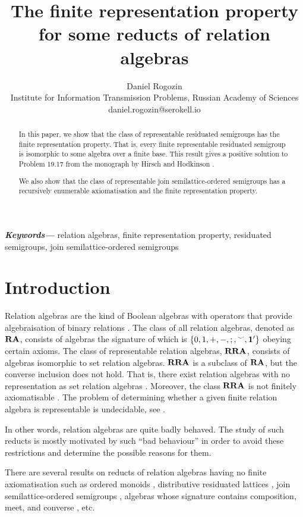 \documentclass[a4paper]{article}
\author{Daniel Rogozin \\ Institute for Information Transmission Problems, Russian Academy of Sciences \\ daniel.rogozin@serokell.io}
\date{}
\title{The finite representation property for some reducts of relation algebras}
\theoremstyle{definition}
\theoremstyle{theorem}
\theoremstyle{proposition}
\theoremstyle{lemma}
\theoremstyle{ex}
\theoremstyle{corollary}
\theoremstyle{claim}
\providecommand{\keywords}[1]{\textbf{\textit{Keywords---}} #1}
\begin{document}
\maketitle

\begin{abstract}
In this paper, we show that the class of representable residuated semigroups has the finite representation property. That is, every finite representable residuated semigroup is isomorphic to some algebra over a finite base. This result gives a positive solution to Problem 19.17 from the monograph by Hirsch and Hodkinson \cite{hirsch2002relation}.

We also show that the class of representable join semilattice-ordered semigroups has a recursively
enumerable axiomatisation and the finite representation property.
\end{abstract}

\keywords{relation algebras, finite representation property, residuated semigroups, join semilattice-ordered semigroups}

\section{Introduction}

Relation algebras are the kind of Boolean algebras with operators that provide algebraisation
of binary relations \cite{jonsson1951boolean}. The class of all relation algebras,
denoted as ${\bf RA}$, consists of algebras the signature of which is $\{ 0, 1, +, -, ;, {}^{\smile}, {\bf 1}' \}$ obeying certain axioms.
The class of representable relation algebras, ${\bf RRA}$, consists of algebras isomorphic to set relation algebras. ${\bf RRA}$ is a subclass of ${\bf RA}$, but the converse inclusion does not hold.
That is, there exist relation algebras with no representation as set relation algebras
\cite{lyndon1950representation}. Moreover, the class ${\bf RRA}$ is not finitely axiomatisable \cite{monk1964representable}. The problem of determining whether a given finite relation algebra
is representable is undecidable, see \cite{hirsch2001representability}.

In other words, relation algebras are quite badly behaved. The study of such reducts is mostly motivated by such ``bad behaviour'' in order to avoid these restrictions and determine the possible reasons for them.

There are several results on reducts of relation algebras having no finite axiomatisation such as ordered monoids \cite{hirsch2005class}, distributive residuated lattices \cite{andreka1994lambek}, join semilattice-ordered semigroups \cite{andreka2011axiomatizability}, algebras whose signature contains composition, meet, and converse \cite{hodkinson2000axiomatizability}, etc.
\end{document}
